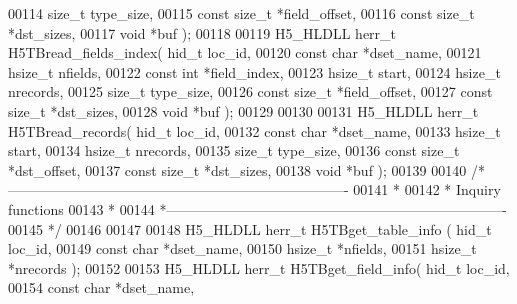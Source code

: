 \begin{DoxyCode}
00114                              \textcolor{keywordtype}{size\_t} type\_size,
00115                              \textcolor{keyword}{const} \textcolor{keywordtype}{size\_t} *field\_offset,
00116                              \textcolor{keyword}{const} \textcolor{keywordtype}{size\_t} *dst\_sizes,
00117                              \textcolor{keywordtype}{void} *buf );
00118 
00119 H5\_HLDLL herr\_t  H5TBread\_fields\_index( hid\_t loc\_id,
00120                               \textcolor{keyword}{const} \textcolor{keywordtype}{char} *dset\_name,
00121                               hsize\_t nfields,
00122                               \textcolor{keyword}{const} \textcolor{keywordtype}{int} *field\_index,
00123                               hsize\_t start,
00124                               hsize\_t nrecords,
00125                               \textcolor{keywordtype}{size\_t} type\_size,
00126                               \textcolor{keyword}{const} \textcolor{keywordtype}{size\_t} *field\_offset,
00127                               \textcolor{keyword}{const} \textcolor{keywordtype}{size\_t} *dst\_sizes,
00128                               \textcolor{keywordtype}{void} *buf );
00129 
00130 
00131 H5\_HLDLL herr\_t  H5TBread\_records( hid\_t loc\_id,
00132                          \textcolor{keyword}{const} \textcolor{keywordtype}{char} *dset\_name,
00133                          hsize\_t start,
00134                          hsize\_t nrecords,
00135                          \textcolor{keywordtype}{size\_t} type\_size,
00136                          \textcolor{keyword}{const} \textcolor{keywordtype}{size\_t} *dst\_offset,
00137                          \textcolor{keyword}{const} \textcolor{keywordtype}{size\_t} *dst\_sizes,
00138                          \textcolor{keywordtype}{void} *buf );
00139 
00140 \textcolor{comment}{/*-------------------------------------------------------------------------}
00141 \textcolor{comment}{ *}
00142 \textcolor{comment}{ * Inquiry functions}
00143 \textcolor{comment}{ *}
00144 \textcolor{comment}{ *-------------------------------------------------------------------------}
00145 \textcolor{comment}{ */}
00146 
00147 
00148 H5\_HLDLL herr\_t  H5TBget\_table\_info ( hid\_t loc\_id,
00149                             \textcolor{keyword}{const} \textcolor{keywordtype}{char} *dset\_name,
00150                             hsize\_t *nfields,
00151                             hsize\_t *nrecords );
00152 
00153 H5\_HLDLL herr\_t  H5TBget\_field\_info( hid\_t loc\_id,
00154                            \textcolor{keyword}{const} \textcolor{keywordtype}{char} *dset\_name,

\end{DoxyCode}
